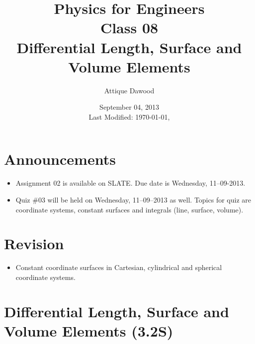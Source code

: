 \documentclass[12pt,a4paper]{article}
\title{\vspace{-2cm}Physics for Engineers\\Class 08\\Differential Length, Surface and Volume Elements}
\author{Attique Dawood}
\date{September 04, 2013\\[0.2cm] Last Modified: \today, \currenttime}
\begin{document}
\maketitle
\section{Announcements}
\begin{itemize}
\item Assignment 02 is available on SLATE. Due date is Wednesday, 11--09-2013.
\item Quiz \#03 will be held on Wednesday, 11--09--2013 as well. Topics for quiz are coordinate systems, constant surfaces and integrals (line, surface, volume).
\end{itemize}
\section{Revision}
\begin{itemize}
\item Constant coordinate surfaces in Cartesian, cylindrical and spherical coordinate systems.
\end{itemize}
\section{Differential Length, Surface and Volume Elements (3.2S)}
\end{document}
